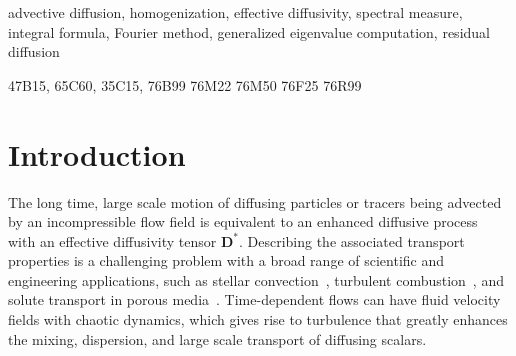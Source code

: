 \documentclass[leqno,onefignum,onetabnum]{siamltex1213}
\begin{document}
\begin{keywords}
advective diffusion, homogenization, effective diffusivity, spectral
measure, integral formula, Fourier method, generalized eigenvalue computation, residual diffusion
\end{keywords}

\begin{AMS}
47B15,
65C60,
35C15,
76B99
76M22
76M50
76F25
76R99   	
\end{AMS}


\pagestyle{myheadings}
\thispagestyle{plain}


\section{Introduction}\label{sec:Introduction}
The long time, large scale motion of diffusing particles or
tracers being advected by an incompressible flow field is equivalent
to an enhanced diffusive process~\cite{Taylor:PRSL:196} with an
effective diffusivity tensor $\mathbf{D}^*$. Describing the associated
transport properties is a challenging problem with a broad range of
scientific and engineering applications, such as stellar
convection~\cite{Knobloch:1992ApJ,Press:1981:ApJ,canut98,canut98b,canut00},
turbulent
combustion~\cite{Aslanyan:BF00790149,Bilger:05:10.1016,Tabaczynski:1990:243},
and solute transport in porous
media~\cite{Bhattacharya:AAP:1999:951,Bhattacharya:1989:ASD,Whitaker:AIC690130308,Gupta:WRCR3940,Koch:1988:965,Lester:PRL:111.174101,Koch:JFM:7961001}.
Time-dependent flows can have fluid velocity fields with chaotic
dynamics, which gives rise to turbulence that greatly enhances the
mixing, dispersion, and large scale transport of diffusing scalars.   
\end{document}

